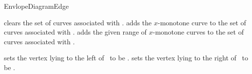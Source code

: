 \begin{ccRefConcept}{EnvlopeDiagramEdge}
\ccModifiers

    {clears the set of curves associated with \ccVar.}
\ccGlue
{}
    {adds the $x$-monotone curve  to the set of curves associated with \ccVar.}
\ccGlue
{}
    {adds the given range of $x$-monotone curves to the set of curves associated with \ccVar.}

    {sets the vertex lying to the left of \ccVar\ to be .}
\ccGlue
{}
    {sets the vertex lying to the right of \ccVar\ to be .}

\ccSeeAlso
     \\
     \\

\end{ccRefConcept}

\ccRefPageEnd

